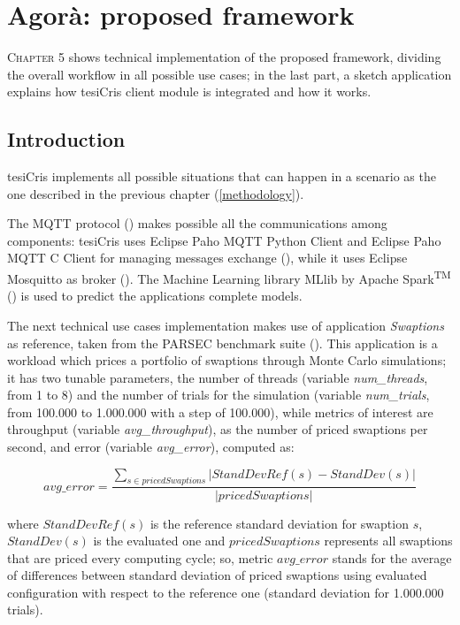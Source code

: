 \chapter{Agorà: proposed framework}\label{agora}

\lettrine{C}{hapter} 5 shows technical implementation of the proposed framework, dividing the overall workflow in all possible use cases; in the last part, a sketch application explains how tesiCris client module is integrated and how it works.


\section{Introduction}

tesiCris implements all possible situations that can happen in a scenario as the one described in the previous chapter (\ref{methodology}).

The MQTT protocol (\cite{banks2014mqtt}) makes possible all the communications among components: tesiCris uses Eclipse Paho MQTT Python Client and Eclipse Paho MQTT C Client for managing messages exchange (\cite{o2014paho}), while it uses Eclipse Mos\-quitto as broker (\cite{light2013mosquitto}). The Machine Learning library MLlib by Apache Spark\textsuperscript{TM} (\cite{spark2015apache}) is used to predict the applications complete models.

The next technical use cases implementation makes use of application \textit{Swaptions} as reference, taken from the PARSEC benchmark suite (\cite{bienia2008parsec}). This application is a workload which prices a portfolio of swaptions through Monte Carlo simulations; it has two tunable parameters, the number of threads (variable \textit{num\_threads}, from 1 to 8) and the number of trials for the simulation (variable \textit{num\_trials}, from 100.000 to 1.000.000 with a step of 100.000), while metrics of interest are throughput (variable \textit{avg\_throughput}), as the number of priced swaptions per second, and error (variable \textit{avg\_error}), computed as:

\[
avg\_error = \dfrac{\sum_{s \in pricedSwaptions} \left\vert StandDevRef(s) - StandDev(s) \right\vert}{\left\vert pricedSwaptions \right\vert}
\]

where $StandDevRef(s)$ is the reference standard deviation for swaption $s$, $StandDev(s)$ is the evaluated one and $pricedSwaptions$ represents all swaptions that are priced every computing cycle; so, metric $avg\_error$ stands for the average of differences between standard deviation of priced swaptions using evaluated configuration with respect to the reference one (standard deviation for 1.000.000 trials).

